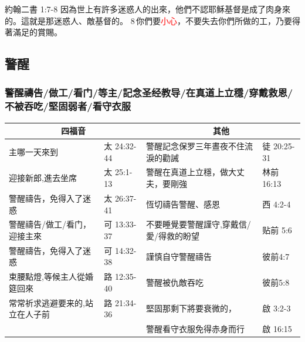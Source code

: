 約翰二書 1:7-8
因為世上有許多迷惑人的出來，他們不認耶穌基督是成了肉身來的。這就是那迷惑人、敵基督的。 8 你們要\textcolor{red}{小心}，不要失去你們所做的工，乃要得著滿足的賞賜。




















\subsection{警醒}
\subsubsection{警醒禱告/做工/看门/等主/記念圣经教导/在真道上立穩/穿戴救恩/不被吞吃/堅固弱者/看守衣服}
\begin{table}[H]
\centering
\begin{tabular}{l|l|l|l}\hline
\multicolumn{2}{c|}{四福音} & \multicolumn{2}{c}{其他} \\\hline\hline
主哪一天來到& 太 24:32-44&警醒記念保罗三年晝夜不住流淚的勸誡& 徒 20:25-31\\\hline
迎接新郎,進去坐席& 太 25:1-13&警醒在真道上立穩，做大丈夫，要剛強&林前16:13 \\\hline
警醒禱告，免得入了迷惑& 太 26:37-41&恆切禱告警醒、感恩&西 4:2-4 \\\hline
警醒禱告/做工/看门，迎接主來& 可 13:33-37&不要睡覺要警醒謹守,穿戴信/愛/得救的盼望&贴前 5:6 \\\hline
警醒禱告，免得入了迷惑& 可 14:32-38&謹慎自守警醒禱告& 彼前4:7\\\hline
束腰點燈,等候主人從婚筵回來& 路 12:35-40&警醒被仇敵吞吃&彼前5:8 \\\hline
常常祈求逃避要来的,站立在人子前& 路 21:34-36&堅固那剩下將要衰微的，& 啟 3:2-3\\\hline
& &警醒看守衣服免得赤身而行&啟 16:15 \\\hline\hline
\end{tabular}
\end{table}

